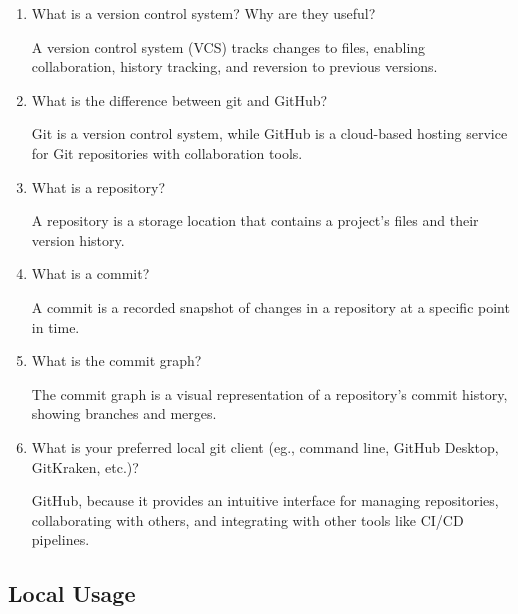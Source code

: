 \documentclass[10pt,twocolumn]{article}
\begin{document}
\begin{enumerate}
    \item What is a version control system? Why are they useful?
    
    A version control system (VCS) tracks changes to files, enabling collaboration, history tracking, and reversion to previous versions.
    
    \item What is the difference between git and GitHub?
    
    Git is a version control system, while GitHub is a cloud-based hosting service for Git repositories with collaboration tools.
    
    \item What is a repository?
    
    A repository is a storage location that contains a project's files and their version history.
    
    \item What is a commit?
    
    A commit is a recorded snapshot of changes in a repository at a specific point in time.
    
    \item What is the commit graph?
    
    The commit graph is a visual representation of a repository’s commit history, showing branches and merges.
    
    \item What is your preferred local git client (eg., command line, GitHub Desktop, GitKraken, etc.)?
    
    GitHub, because it provides an intuitive interface for managing repositories, collaborating with others, and integrating with other tools like CI/CD pipelines.
\end{enumerate}

\subsection{Local Usage}
\end{document}
